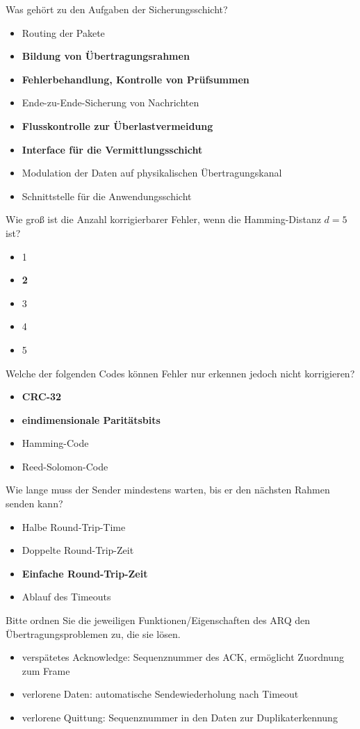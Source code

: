 \documentclass{article}
\begin{document}
	Was gehört zu den Aufgaben der Sicherungsschicht? 
	\begin{itemize}
		\item Routing der Pakete
		\item \textbf{Bildung von Übertragungsrahmen}
		\item \textbf{Fehlerbehandlung, Kontrolle von Prüfsummen}
		\item Ende-zu-Ende-Sicherung von Nachrichten
		\item \textbf{Flusskontrolle zur Überlastvermeidung}
		\item \textbf{Interface für die Vermittlungsschicht}
		\item Modulation der Daten auf physikalischen Übertragungskanal
		\item Schnittstelle für die Anwendungsschicht
	\end{itemize}

	Wie groß ist die Anzahl korrigierbarer Fehler, wenn die Hamming-Distanz $d=5$ ist?
	\begin{itemize}
		\item 1
		\item \textbf{2}
		\item 3
		\item 4
		\item 5
	\end{itemize}

	Welche der folgenden Codes können Fehler nur erkennen jedoch nicht korrigieren? 
	\begin{itemize}
		\item \textbf{CRC-32}
		\item \textbf{eindimensionale Paritätsbits}
		\item Hamming-Code
		\item Reed-Solomon-Code
	\end{itemize}

	Wie lange muss der Sender mindestens warten, bis er den nächsten Rahmen senden kann? 
	\begin{itemize}
		\item Halbe Round-Trip-Time
		\item Doppelte Round-Trip-Zeit 
		\item \textbf{Einfache Round-Trip-Zeit }
		\item Ablauf des Timeouts 
	\end{itemize}

	Bitte ordnen Sie die jeweiligen Funktionen/Eigenschaften des ARQ den Übertragungsproblemen zu, die sie lösen. 
	\begin{itemize}
		\item verspätetes Acknowledge: Sequenznummer des ACK, ermöglicht Zuordnung zum Frame
		\item verlorene Daten: automatische Sendewiederholung nach Timeout 
		\item verlorene Quittung: Sequenznummer in den Daten zur Duplikaterkennung 
	\end{itemize}
\end{document}
